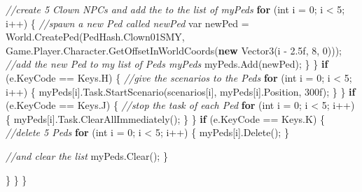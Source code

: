 \documentclass[
  openany]{book}
\newenvironment{Shaded}{\begin{snugshade}}{\end{snugshade}}
\newcommand{\CommentTok}[1]{\textcolor[rgb]{0.56,0.35,0.01}{\textit{#1}}}
\newcommand{\DataTypeTok}[1]{\textcolor[rgb]{0.13,0.29,0.53}{#1}}
\newcommand{\DecValTok}[1]{\textcolor[rgb]{0.00,0.00,0.81}{#1}}
\newcommand{\FloatTok}[1]{\textcolor[rgb]{0.00,0.00,0.81}{#1}}
\newcommand{\FunctionTok}[1]{\textcolor[rgb]{0.00,0.00,0.00}{#1}}
\newcommand{\KeywordTok}[1]{\textcolor[rgb]{0.13,0.29,0.53}{\textbf{#1}}}
\newcommand{\NormalTok}[1]{#1}
\begin{document}
\begin{Shaded}
\begin{Highlighting}[]
                \CommentTok{//create 5 Clown NPCs and add the to the list of myPeds}
                \KeywordTok{for}\NormalTok{ (}\DataTypeTok{int}\NormalTok{ i = }\DecValTok{0}\NormalTok{; i < }\DecValTok{5}\NormalTok{; i++)}
\NormalTok{                \{}
                    \CommentTok{//spawn a new Ped called newPed}
                    \DataTypeTok{var}\NormalTok{ newPed = World.}\FunctionTok{CreatePed}\NormalTok{(PedHash.}\FunctionTok{Clown01SMY}\NormalTok{, Game.}\FunctionTok{Player}\NormalTok{.}\FunctionTok{Character}\NormalTok{.}\FunctionTok{GetOffsetInWorldCoords}\NormalTok{(}\KeywordTok{new} \FunctionTok{Vector3}\NormalTok{(i - }\FloatTok{2.5f}\NormalTok{, }\DecValTok{8}\NormalTok{, }\DecValTok{0}\NormalTok{)));}
                    \CommentTok{//add the new Ped to my list of Peds myPeds}
\NormalTok{                    myPeds.}\FunctionTok{Add}\NormalTok{(newPed);}
\NormalTok{                \}}
\NormalTok{            \}}
            \KeywordTok{if}\NormalTok{ (e.}\FunctionTok{KeyCode}\NormalTok{ == Keys.}\FunctionTok{H}\NormalTok{)}
\NormalTok{            \{}
                \CommentTok{//give the scenarios to the Peds}
                \KeywordTok{for}\NormalTok{ (}\DataTypeTok{int}\NormalTok{ i = }\DecValTok{0}\NormalTok{; i < }\DecValTok{5}\NormalTok{; i++)}
\NormalTok{                \{}
\NormalTok{                        myPeds[i].}\FunctionTok{Task}\NormalTok{.}\FunctionTok{StartScenario}\NormalTok{(scenarios[i], myPeds[i].}\FunctionTok{Position}\NormalTok{, 300f); }
\NormalTok{                \}}
\NormalTok{            \}}
            \KeywordTok{if}\NormalTok{ (e.}\FunctionTok{KeyCode}\NormalTok{ == Keys.}\FunctionTok{J}\NormalTok{)}
\NormalTok{            \{}
                    \CommentTok{//stop the task of each Ped}
                    \KeywordTok{for}\NormalTok{ (}\DataTypeTok{int}\NormalTok{ i = }\DecValTok{0}\NormalTok{; i < }\DecValTok{5}\NormalTok{; i++)}
\NormalTok{                \{}
\NormalTok{                        myPeds[i].}\FunctionTok{Task}\NormalTok{.}\FunctionTok{ClearAllImmediately}\NormalTok{(); }
\NormalTok{                \}}
\NormalTok{            \}}
            \KeywordTok{if}\NormalTok{ (e.}\FunctionTok{KeyCode}\NormalTok{ == Keys.}\FunctionTok{K}\NormalTok{)}
\NormalTok{            \{}
                \CommentTok{//delete 5 Peds}
                \KeywordTok{for}\NormalTok{ (}\DataTypeTok{int}\NormalTok{ i = }\DecValTok{0}\NormalTok{; i < }\DecValTok{5}\NormalTok{; i++)}
\NormalTok{                \{}
\NormalTok{                    myPeds[i].}\FunctionTok{Delete}\NormalTok{();}
\NormalTok{                \}}

                \CommentTok{//and clear the list}
\NormalTok{                myPeds.}\FunctionTok{Clear}\NormalTok{();}
\NormalTok{            \}}

\NormalTok{        \}}
\NormalTok{    \}}
\NormalTok{\}}


\end{Highlighting}
\end{Shaded}
\end{document}
